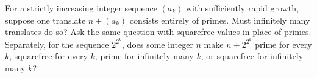 For a strictly increasing integer sequence $(a_k)$ with sufficiently rapid growth, suppose one translate $n+(a_k)$ consists entirely of primes. Must infinitely many translates do so? Ask the same question with squarefree values in place of primes. Separately, for the sequence $2^{2^k}$, does some integer $n$ make $n+2^{2^k}$ prime for every $k$, squarefree for every $k$, prime for infinitely many $k$, or squarefree for infinitely many $k$?

